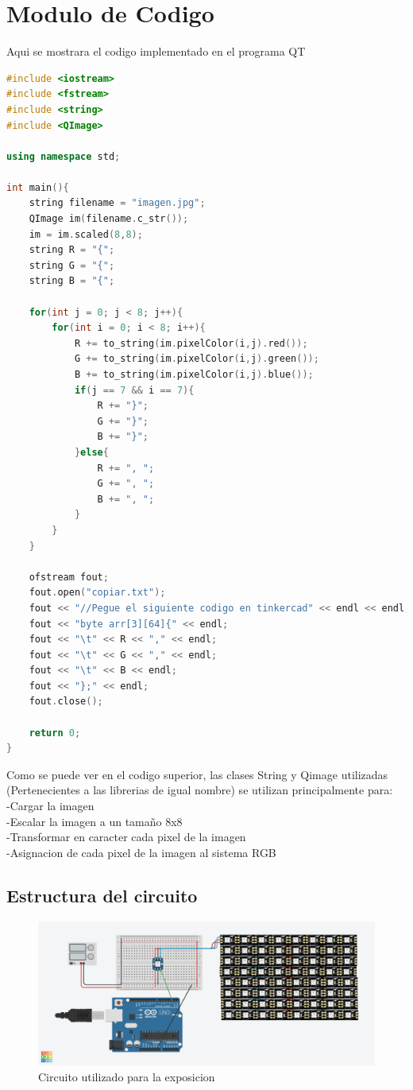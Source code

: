 \documentclass{article}
\begin{document}
\section{Modulo de Codigo} \label{contenido}
Aqui se mostrara el codigo implementado en el programa QT
\begin{lstlisting}[language=C++, label=codigo_ejemplo]
#include <iostream>
#include <fstream>
#include <string>
#include <QImage>

using namespace std;

int main(){
    string filename = "imagen.jpg";
    QImage im(filename.c_str());
    im = im.scaled(8,8);
    string R = "{";
    string G = "{";
    string B = "{";

    for(int j = 0; j < 8; j++){
        for(int i = 0; i < 8; i++){
            R += to_string(im.pixelColor(i,j).red());
            G += to_string(im.pixelColor(i,j).green());
            B += to_string(im.pixelColor(i,j).blue());
            if(j == 7 && i == 7){
                R += "}";
                G += "}";
                B += "}";
            }else{
                R += ", ";
                G += ", ";
                B += ", ";
            }
        }
    }

    ofstream fout;
    fout.open("copiar.txt");
    fout << "//Pegue el siguiente codigo en tinkercad" << endl << endl;
    fout << "byte arr[3][64]{" << endl;
    fout << "\t" << R << "," << endl;
    fout << "\t" << G << "," << endl;
    fout << "\t" << B << endl;
    fout << "};" << endl;
    fout.close();

    return 0;
}
\end{lstlisting}
Como se puede ver en el codigo superior, las clases String y Qimage utilizadas (Pertenecientes a las librerias de igual nombre) se utilizan principalmente para:\\
-Cargar la imagen\\
-Escalar la imagen a un tamaño 8x8\\
-Transformar en caracter cada pixel de la imagen\\
-Asignacion de cada pixel de la imagen al sistema RGB\\
\newpage
\subsection{Estructura del circuito}\label{}
\begin{figure}[htb]
\centering
\includegraphics[width=15cm]{Circuito_Parcial_2}
\caption{Circuito utilizado para la exposicion}
\end{figure}
\newpage
\end{document}
